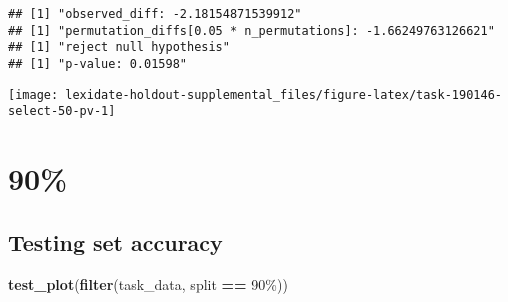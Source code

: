 \documentclass[
]{book}
\newenvironment{Shaded}{\begin{snugshade}}{\end{snugshade}}
\newcommand{\AttributeTok}[1]{\textcolor[rgb]{0.13,0.29,0.53}{#1}}
\newcommand{\DecValTok}[1]{\textcolor[rgb]{0.00,0.00,0.81}{#1}}
\newcommand{\FunctionTok}[1]{\textcolor[rgb]{0.13,0.29,0.53}{\textbf{#1}}}
\newcommand{\NormalTok}[1]{#1}
\newcommand{\OtherTok}[1]{\textcolor[rgb]{0.56,0.35,0.01}{#1}}
\newcommand{\SpecialCharTok}[1]{\textcolor[rgb]{0.81,0.36,0.00}{\textbf{#1}}}
\newcommand{\StringTok}[1]{\textcolor[rgb]{0.31,0.60,0.02}{#1}}
\begin{document}
\begin{Shaded}
\end{Shaded}

\begin{verbatim}
## [1] "observed_diff: -2.18154871539912"
## [1] "permutation_diffs[0.05 * n_permutations]: -1.66249763126621"
## [1] "reject null hypothesis"
## [1] "p-value: 0.01598"
\end{verbatim}

\texttt{[image: lexidate-holdout-supplemental\_files/figure-latex/task-190146-select-50-pv-1]}

\hypertarget{section-18}{%
\section{90\%}\label{section-18}}

\hypertarget{testing-set-accuracy-18}{%
\subsection{Testing set accuracy}\label{testing-set-accuracy-18}}

\begin{Shaded}
\begin{Highlighting}[]
\FunctionTok{test\_plot}\NormalTok{(}\FunctionTok{filter}\NormalTok{(task\_data, split }\SpecialCharTok{==} \StringTok{\textquotesingle{}90\%\textquotesingle{}}\NormalTok{))}
\end{Highlighting}
\end{Shaded}
\end{document}
